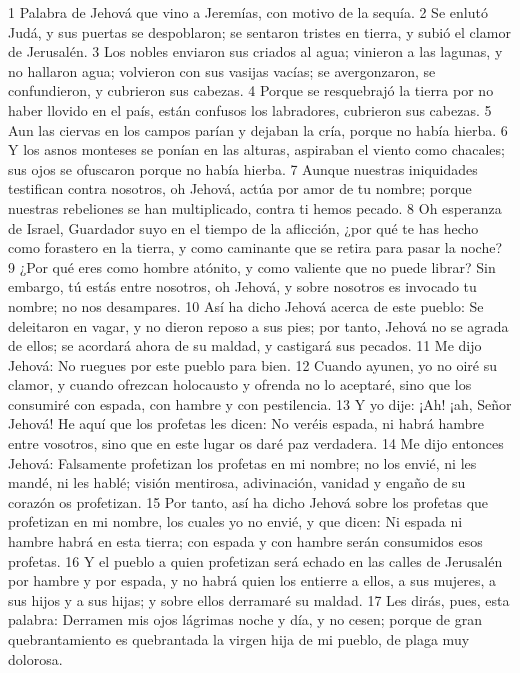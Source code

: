 1 Palabra de Jehová que vino a Jeremías, con motivo de la sequía.
2 Se enlutó Judá, y sus puertas se despoblaron; se sentaron tristes en tierra, y subió el clamor de Jerusalén.
3 Los nobles enviaron sus criados al agua; vinieron a las lagunas, y no hallaron agua; volvieron con sus vasijas vacías; se avergonzaron, se confundieron, y cubrieron sus cabezas.
4 Porque se resquebrajó la tierra por no haber llovido en el país, están confusos los labradores, cubrieron sus cabezas.
5 Aun las ciervas en los campos parían y dejaban la cría, porque no había hierba.
6 Y los asnos monteses se ponían en las alturas, aspiraban el viento como chacales; sus ojos se ofuscaron porque no había hierba.
7 Aunque nuestras iniquidades testifican contra nosotros, oh Jehová, actúa por amor de tu nombre; porque nuestras rebeliones se han multiplicado, contra ti hemos pecado.
8 Oh esperanza de Israel, Guardador suyo en el tiempo de la aflicción, ¿por qué te has hecho como forastero en la tierra, y como caminante que se retira para pasar la noche?
9 ¿Por qué eres como hombre atónito, y como valiente que no puede librar? Sin embargo, tú estás entre nosotros, oh Jehová, y sobre nosotros es invocado tu nombre; no nos desampares.
10 Así ha dicho Jehová acerca de este pueblo: Se deleitaron en vagar, y no dieron reposo a sus pies; por tanto, Jehová no se agrada de ellos; se acordará ahora de su maldad, y castigará sus pecados.
11 Me dijo Jehová: No ruegues por este pueblo para bien.
12 Cuando ayunen, yo no oiré su clamor, y cuando ofrezcan holocausto y ofrenda no lo aceptaré, sino que los consumiré con espada, con hambre y con pestilencia.
13 Y yo dije: ¡Ah! ¡ah, Señor Jehová! He aquí que los profetas les dicen: No veréis espada, ni habrá hambre entre vosotros, sino que en este lugar os daré paz verdadera.
14 Me dijo entonces Jehová: Falsamente profetizan los profetas en mi nombre; no los envié, ni les mandé, ni les hablé; visión mentirosa, adivinación, vanidad y engaño de su corazón os profetizan.
15 Por tanto, así ha dicho Jehová sobre los profetas que profetizan en mi nombre, los cuales yo no envié, y que dicen: Ni espada ni hambre habrá en esta tierra; con espada y con hambre serán consumidos esos profetas.
16 Y el pueblo a quien profetizan será echado en las calles de Jerusalén por hambre y por espada, y no habrá quien los entierre a ellos, a sus mujeres, a sus hijos y a sus hijas; y sobre ellos derramaré su maldad.
17 Les dirás, pues, esta palabra: Derramen mis ojos lágrimas noche y día, y no cesen; porque de gran quebrantamiento es quebrantada la virgen hija de mi pueblo, de plaga muy dolorosa.
